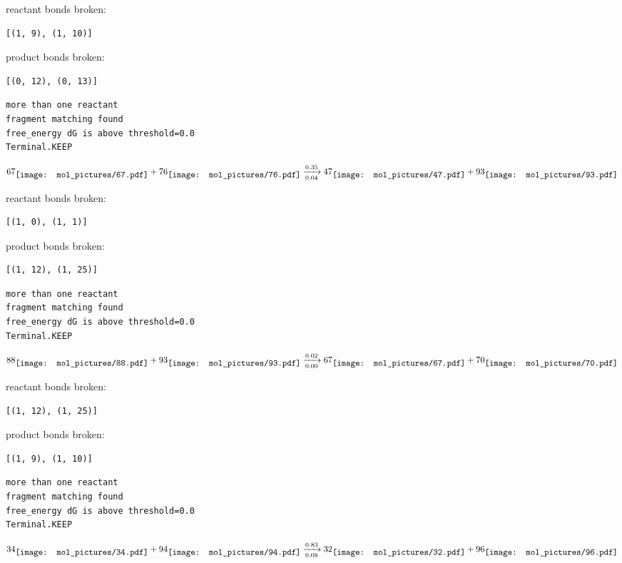 \documentclass{article}
\begin{document}
reactant bonds broken:\begin{verbatim}
[(1, 9), (1, 10)]
\end{verbatim}
product bonds broken:\begin{verbatim}
[(0, 12), (0, 13)]
\end{verbatim}




\vspace{1cm}
\begin{verbatim}
more than one reactant
fragment matching found
free_energy dG is above threshold=0.0
Terminal.KEEP
\end{verbatim}
$$
67
\raisebox{-.5\height}{\texttt{[image: mol\_pictures/67.pdf]}}
+
76
\raisebox{-.5\height}{\texttt{[image: mol\_pictures/76.pdf]}}
\xrightarrow[0.04]{0.35}
47
\raisebox{-.5\height}{\texttt{[image: mol\_pictures/47.pdf]}}
+
93
\raisebox{-.5\height}{\texttt{[image: mol\_pictures/93.pdf]}}
$$


reactant bonds broken:\begin{verbatim}
[(1, 0), (1, 1)]
\end{verbatim}
product bonds broken:\begin{verbatim}
[(1, 12), (1, 25)]
\end{verbatim}




\vspace{1cm}
\begin{verbatim}
more than one reactant
fragment matching found
free_energy dG is above threshold=0.0
Terminal.KEEP
\end{verbatim}
$$
88
\raisebox{-.5\height}{\texttt{[image: mol\_pictures/88.pdf]}}
+
93
\raisebox{-.5\height}{\texttt{[image: mol\_pictures/93.pdf]}}
\xrightarrow[0.00]{0.02}
67
\raisebox{-.5\height}{\texttt{[image: mol\_pictures/67.pdf]}}
+
70
\raisebox{-.5\height}{\texttt{[image: mol\_pictures/70.pdf]}}
$$


reactant bonds broken:\begin{verbatim}
[(1, 12), (1, 25)]
\end{verbatim}
product bonds broken:\begin{verbatim}
[(1, 9), (1, 10)]
\end{verbatim}




\vspace{1cm}
\begin{verbatim}
more than one reactant
fragment matching found
free_energy dG is above threshold=0.0
Terminal.KEEP
\end{verbatim}
$$
34
\raisebox{-.5\height}{\texttt{[image: mol\_pictures/34.pdf]}}
+
94
\raisebox{-.5\height}{\texttt{[image: mol\_pictures/94.pdf]}}
\xrightarrow[0.08]{0.83}
32
\raisebox{-.5\height}{\texttt{[image: mol\_pictures/32.pdf]}}
+
96
\raisebox{-.5\height}{\texttt{[image: mol\_pictures/96.pdf]}}
$$
\end{document}
